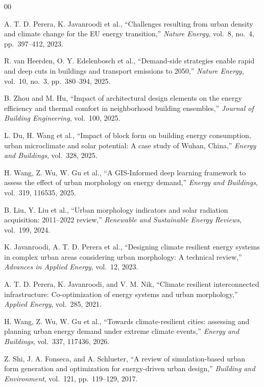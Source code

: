 \begin{thebibliography}{00}

A. T. D. Perera, K. Javanroodi et al., ``Challenges resulting from urban density and climate change for the EU energy transition,'' \emph{Nature Energy}, vol.~8, no.~4, pp.~397--412, 2023.

R. van Heerden, O. Y. Edelenbosch et al., ``Demand-side strategies enable rapid and deep cuts in buildings and transport emissions to 2050,'' \emph{Nature Energy}, vol.~10, no.~3, pp.~380--394, 2025.

B. Zhou and M. Hu, ``Impact of architectural design elements on the energy efficiency and thermal comfort in neighborhood building ensembles,'' \emph{Journal of Building Engineering}, vol.~100, 2025.

L. Du, H. Wang et al., ``Impact of block form on building energy consumption, urban microclimate and solar potential: A case study of Wuhan, China,'' \emph{Energy and Buildings}, vol.~328, 2025.

H. Wang, Z. Wu, W. Gu et al., ``A GIS-Informed deep learning framework to assess the effect of urban morphology on energy demand,'' \emph{Energy and Buildings}, vol.~319, 116535, 2025.

B. Liu, Y. Liu et al., ``Urban morphology indicators and solar radiation acquisition: 2011--2022 review,'' \emph{Renewable and Sustainable Energy Reviews}, vol.~199, 2024.

K. Javanroodi, A. T. D. Perera et al., ``Designing climate resilient energy systems in complex urban areas considering urban morphology: A technical review,'' \emph{Advances in Applied Energy}, vol.~12, 2023.

A. T. D. Perera, K. Javanroodi, and V. M. Nik, ``Climate resilient interconnected infrastructure: Co-optimization of energy systems and urban morphology,'' \emph{Applied Energy}, vol.~285, 2021.

H. Wang, Z. Wu, W. Gu et al., ``Towards climate-resilient cities: assessing and planning urban energy demand under extreme climate events,'' \emph{Energy and Buildings}, vol.~337, 117436, 2026.

Z. Shi, J. A. Fonseca, and A. Schlueter, ``A review of simulation-based urban form generation and optimization for energy-driven urban design,'' \emph{Building and Environment}, vol.~121, pp.~119--129, 2017.


\end{thebibliography}
